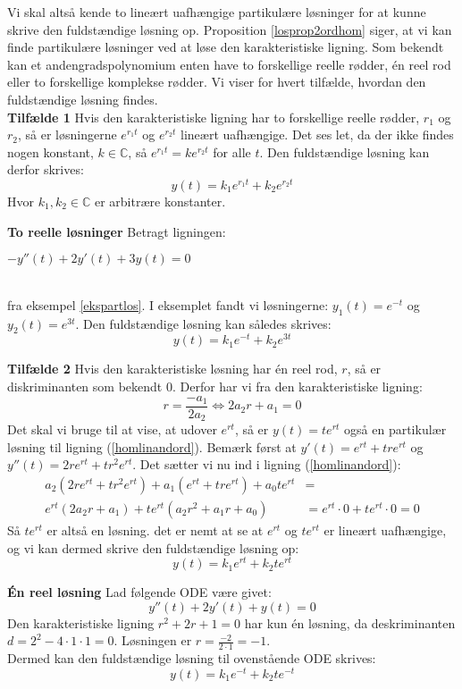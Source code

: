 \hfill \break
Vi skal altså kende to lineært uafhængige partikulære løsninger for at kunne skrive den fuldstændige løsning op. Proposition \ref{losprop2ordhom} siger, at vi kan finde partikulære løsninger ved at løse den karakteristiske ligning. Som bekendt kan et andengradspolynomium enten have to forskellige reelle rødder, én reel rod eller to forskellige komplekse rødder. Vi viser for hvert tilfælde, hvordan den fuldstændige løsning findes. \\ \hfill \break
\textbf{Tilfælde 1}\hfill \break
Hvis den karakteristiske ligning har to forskellige reelle rødder, $r_1$ og $r_2$, så er løsningerne $e^{r_1t}$ og $e^{r_2t}$ lineært uafhængige. Det ses let, da der ikke findes nogen konstant, $k\in \mathbb{C}$, så $e^{r_1t}=ke^{r_2t}$ for alle $t$. Den fuldstændige løsning kan derfor skrives: \hfill \break
$$y(t)=k_1e^{r_1t}+k_2e^{r_2t}$$\hfill \break
Hvor $k_1,k_2\in \mathbb{C}$ er arbitrære konstanter.\\ \hfill \break
\begin{Example}\textbf{To reelle løsninger}\hfill \break
\textnormal{Betragt ligningen:} \hfill \break
\centerline{$-y''(t)+2y'(t)+3y(t)=0$}\\ \hfill \break
\textnormal{fra eksempel \ref{ekspartlos}. I eksemplet fandt vi løsningerne: $y_1(t)=e^{-t}$ og $y_2(t)=e^{3t}$. Den fuldstændige løsning kan således skrives:}\hfill \break
$$y(t)=k_1e^{-t}+k_2e^{3t}$$
\end{Example}
\hfill \break
\textbf{Tilfælde 2}\hfill \break
Hvis den karakteristiske løsning har én reel rod, $r$, så er diskriminanten som bekendt 0. Derfor har vi fra den karakteristiske ligning: \hfill \break
$$r=\frac{-a_1}{2a_2}\Leftrightarrow 2a_2r+a_1=0$$
\hfill \break
Det skal vi bruge til at vise, at udover $e^{rt}$, så er $y(t)=te^{rt}$ også en partikulær løsning til ligning (\ref{homlinandord}). Bemærk først at $y'(t)=e^{rt}+tre^{rt}$ og $y''(t)=2re^{rt}+tr^2e^{rt}$. Det sætter vi nu ind i ligning (\ref{homlinandord}): 
\hfill \break
\begin{align*}
a_2(2re^{rt}+tr^2e^{rt})+a_1(e^{rt}+tre^{rt})+a_0te^{rt}&=\\
e^{rt}(2a_2r+a_1)+te^{rt}(a_2r^2+a_1r+a_0)&=e^{rt}\cdot 0+te^{rt}\cdot 0=0
\end{align*}
\hfill \break
Så $te^{rt}$ er altså en løsning. det er nemt at se at $e^{rt}$ og $te^{rt}$ er lineært uafhængige, og vi kan dermed skrive den fuldstændige løsning op:\hfill \break
$$y(t)=k_1e^{rt}+k_2te^{rt}$$ \hfill \break
\begin{Example}\textbf{Én reel løsning}\hfill \break
\textnormal{Lad følgende ODE være givet:}\hfill \break
$$y''(t)+2y'(t)+y(t)=0$$\hfill \break
\textnormal{Den karakteristiske ligning $r^2+2r+1=0$ har kun én løsning, da deskriminanten $d=2^2-4\cdot 1\cdot 1=0$. Løsningen er $r=\frac{-2}{2\cdot 1}=-1$.}\\ \hfill \break
\textnormal{Dermed kan den fuldstændige løsning til ovenstående ODE skrives:}\hfill \break
$$y(t)=k_1e^{-t}+k_2te^{-t}$$
\end{Example}
